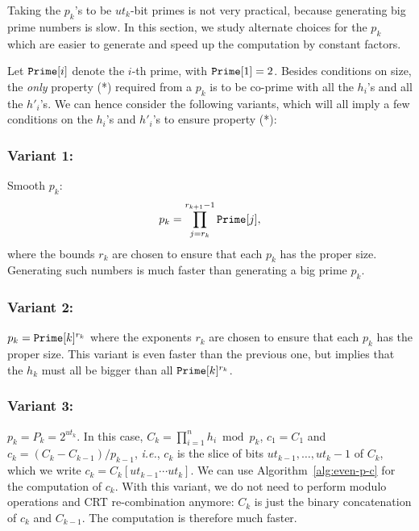 \documentclass[11pt]{llncs}
\begin{document}
Taking the $p_k$'s to be $ut_k$-bit primes is not very practical, because generating big prime numbers is slow. In this section, we study alternate choices for the $p_k$ which are easier to generate and speed up the computation by constant factors.

Let $\mbox{{\tt Prime}}[i]$ denote the $i$-th prime, with $\mbox{{\tt Prime}}[1]=2$. Besides conditions on size, the \textit{only} property (*) required from a $p_k$ is to be co-prime with all the $h_i$'s and all the $h'_i$'s. We can hence consider the following variants, which will all imply a few conditions on the $h_i$'s and $h'_i$'s to ensure property (*):
\subsubsection{Variant 1:} Smooth $p_k$:
\[ p_k=\prod_{j=r_k}^{r_{k+1}-1} \mbox{{\tt Prime}}[j], \]
where the bounds $r_k$ are chosen to ensure that each $p_k$ has the proper size.
Generating such numbers is much faster than generating a big prime $p_k$.

\subsubsection{Variant 2:} $p_k=\mbox{{\tt Prime}}[k]^{r_k}$ where the exponents $r_k$ are chosen to ensure that each $p_k$ has the proper size.
This variant is even faster than the previous one, but implies that the $h_k$ must all be bigger than all
$\mbox{{\tt Prime}}[k]^{r_k}$.

\subsubsection{Variant 3:} $p_k = P_k = 2^{ut_k}$. 
In this case, $C_k = \prod_{i=1}^n h_i \bmod p_k$, $c_1 = C_1$ and $c_k = (C_k - C_{k-1}) / p_{k-1}$, {\it i.e.}, $c_k$ is the slice of bits $ut_{k-1}, \dots, ut_k-1$ of $C_k$, which we write $c_k = C_k[ut_{k-1}\cdots ut_k]$.
We can use Algorithm~\ref{alg:even-p-c} for the computation of $c_k$. With this variant, we do not need to perform modulo operations and CRT re-combination anymore: $C_k$ is just the binary concatenation of $c_k$ and $C_{k-1}$. The computation is therefore much faster.
\end{document}
